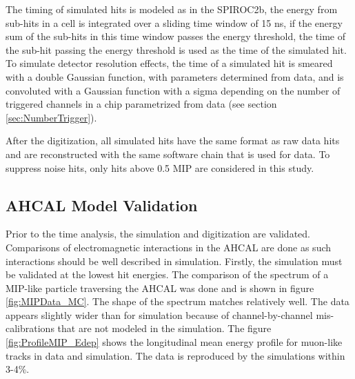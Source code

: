 \documentclass{JINST}
\begin{document}
The timing of simulated hits is modeled as in the SPIROC2b, the energy from sub-hits in a cell is integrated over a sliding time window of 15 ns, if the energy sum of the sub-hits in this time window passes the energy threshold, the time of the sub-hit passing the energy threshold is used as the time of the simulated hit. To simulate detector resolution effects, the time of a simulated hit is smeared with a double Gaussian function, with parameters determined from data, and is convoluted with a Gaussian function with a sigma depending on the number of triggered channels in a chip parametrized from data (see section \ref{sec:NumberTrigger}).

After the digitization, all simulated hits have the same format as raw data hits and are reconstructed with the same software chain that is used for data. To suppress noise hits, only hits above 0.5 MIP are considered in this study.

\subsection{AHCAL Model Validation}

Prior to the time analysis, the simulation and digitization are validated. Comparisons of electromagnetic interactions in the AHCAL are done as such interactions should be well described in simulation. Firstly, the simulation must be validated at the lowest hit energies. The comparison of the spectrum of a MIP-like particle traversing the AHCAL was done and is shown in figure \ref{fig:MIPData_MC}. The shape of the spectrum matches relatively well. The data appears slightly wider than for simulation because of channel-by-channel mis-calibrations that are not modeled in the simulation. The figure \ref{fig:ProfileMIP_Edep} shows the longitudinal mean energy profile for muon-like tracks in data and simulation. The data is reproduced by the simulations within 3-4\%.
\end{document}
